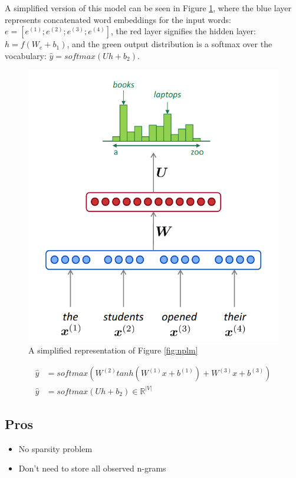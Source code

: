 \documentclass[letterpaper]{article}
\begin{document}
A simplified version of this model can be seen in Figure
\ref{fig:nplmsimple}, where the blue layer represents
concatenated word embeddings for the input words:
$e = [e^{(1)};e^{(2)};e^{(3)};e^{(4)}]$, the red layer signifies
the hidden layer: $h = f(W_e + b_1)$, and the green output distribution
is a softmax over the vocabulary: $\hat{y} = softmax(Uh + b_2)$.


\begin{figure}
	\includegraphics[scale=0.4]{images/Simplified_Neural_Language_Model.png}
	\caption{A simplified representation of Figure \ref{fig:nplm}}
	\label{fig:nplmsimple}
\end{figure}

\begin{align}
	\hat{y} &= softmax(W^{(2)}tanh(W^{(1)}x 
			+  b^{(1)}) + W^{(3)}x + b^{(3)}) \label{eq:nplm} \\
	\hat{y} &= softmax(Uh + b_2) \in \mathbb{R}^{|V|} \label{eq:nplmsimple} 
\end{align}


\subsection{Pros}
\begin{itemize}
	\item No sparsity problem
	\item Don't need to store all observed n-grams
\end{itemize}
\end{document}
